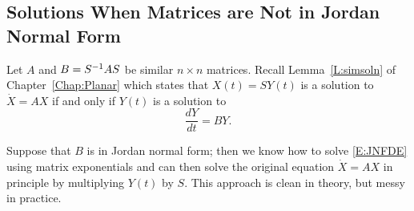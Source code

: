 \documentclass{ximera}
\begin{document}
\subsection*{Solutions When Matrices are Not in Jordan Normal Form} 

Let $A$ and $B=S^{-1} AS$ be similar $n\times n$ matrices.  Recall 
Lemma~\ref{L:simsoln} of Chapter~\ref{Chap:Planar} which states that 
$X(t)=SY(t)$ is a solution to $\dot{X}=AX$ if and only if $Y(t)$ is a 
solution to
\begin{equation} \label{E:JNFDE}
\frac{dY}{dt} = BY.
\end{equation}

Suppose that $B$ is in Jordan normal form; then we know how to solve 
\eqref{E:JNFDE} using matrix exponentials and can then solve the original
equation $\dot{X}=AX$ in principle by multiplying $Y(t)$ by $S$.  This 
approach is clean in theory, but messy in practice.  
\end{document}
